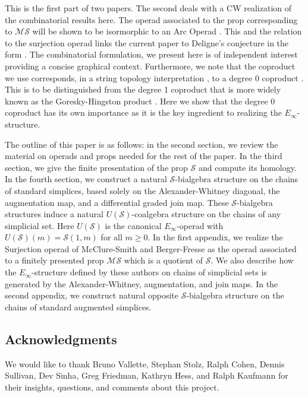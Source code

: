 \documentclass{amsart}
\renewcommand{\S}{\mathcal{S}}
\newcommand{\MS}{\mathcal{MS}}
\theoremstyle{definition}
\begin{document}
	This is the first part of two papers. The second \cite{medina2018cellular} deals with a CW realization of the combinatorial results here. The operad associated to the prop corresponding to $\MS$ will be shown to be isormorphic to an Arc Operad \cite{kaufmann03arc, kaufmann09dimension}. This and the relation to the surjection operad links the current paper to Deligne's conjecture in the form \cite{mcclure2003multivariable, berger2004combinatorial,kaufmann07spinless}.	The combinatorial formulation, we present here is of independent interest providing a concise graphical context. Furthermore, we note that the coproduct we use corresponds, in a string topology interpretation \cite{tradler07string, kaufmann08frobenious}, to a degree 0 coproduct \cite{kaufmann2018detailed}. This is to be distinguished from the degree 1 coproduct that is more widely known as the Goresky-Hingston product \cite{goresky09loop, kaufmann2018detailed}. Here we show that the degree 0 coproduct has its own importance as it is the key ingredient to realizing the $E_\infty$-structure.
	
	The outline of this paper is as follows: in the second section, we review the material on operads and props needed for the rest of the paper. In the third section, we give the finite presentation of the prop $\S$ and compute its homology. In the fourth section, we construct a natural $\S$-bialgebra structure on the chains of standard simplices, based solely on the Alexander-Whitney diagonal, the augmentation map, and a differential graded join map. These $\S$-bialgebra structures induce a natural $U(\S)$-coalgebra structure on the chains of any simplicial set. Here $U(\S)$ is the canonical \mbox{$E_\infty$-operad} with $U(\S)(m)=\S(1,m)$ for all $m\geq 0$. In the first appendix, we realize the Surjection operad of McClure-Smith \cite{mcclure2003multivariable} and Berger-Fresse \cite{berger2004combinatorial} as the operad associated to a finitely presented prop $\MS$ which is a quotient of $\S$. We also describe how the $E_\infty$-structure defined by these authors on chains of simplicial sets is generated by the Alexander-Whitney, augmentation, and join maps. In the second appendix, we construct natural opposite $\S$-bialgebra structure on the chains of standard augmented simplices. 
	
	\subsection*{Acknowledgments} We would like to thank Bruno Vallette, Stephan Stolz, Ralph Cohen, Dennis Sullivan, Dev Sinha, Greg Friedman, Kathryn Hess, and Ralph Kaufmann for their insights, questions, and comments about this project. 
	
\end{document}
